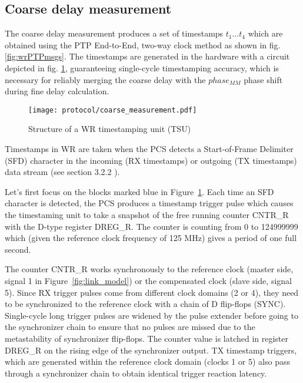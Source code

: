 \subsection{Coarse delay measurement}
\label{s:coarse_delay}
The coarse delay measurement produces a set of timestamps $t_{1} ... t_{4}$
which are obtained using the PTP End-to-End, two-way clock method as shown
in fig. \ref{fig:wrPTPmsgs}. The timestamps are generated in the hardware
with a circuit depicted in fig. \ref{fig:coarse_measurement}, guaranteeing
single-cycle timestamping accuracy, which is necessary for reliably merging the
coarse delay with the $phase_{MM}$ phase shift during fine delay calculation.
\begin{figure}[ht!]
  \centering
  \texttt{[image: protocol/coarse\_measurement.pdf]}
  \caption{Structure of a WR timestamping unit (TSU)}
  \label{fig:coarse_measurement}
\end{figure}
Timestamps in WR are taken when the PCS detects a Start-of-Frame Delimiter
(SFD) character in the incoming (RX timestamps) or outgoing (TX timestamps)
data stream (see section 3.2.2 \cite{tomekMSC}).

Let's first focus on the blocks marked blue in
Figure~\ref{fig:coarse_measurement}. Each time an SFD character is detected,
the PCS produces a timestamp trigger pulse which causes the timestaming unit
to take a snapshot of the free running counter CNTR\_R with the D-type
register DREG\_R. The counter is counting from 0 to 124999999 which (given
the reference clock frequency of 125 MHz) gives a period of one full second.

The counter CNTR\_R works synchronously to the reference clock (master side,
signal 1 in Figure~\ref{fig:link_model}) or the compensated clock (slave side,
signal 5). Since RX trigger pulses come from different clock domains (2 or
4), they need to be synchronized to the reference clock with a chain of
D flip-flops (SYNC). Single-cycle long trigger pulses are widened by the
pulse extender before going to the synchronizer chain to ensure that no
pulses are missed due to the metastability of synchronizer flip-flops. The
counter value is latched in register DREG\_R on the rising edge of the
synchronizer output. TX timestamp triggers, which are generated within the
reference clock domain (clocks 1 or 5) also pass through a synchronizer
chain to obtain identical trigger reaction latency.

